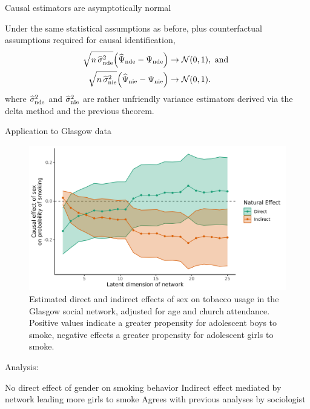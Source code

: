 \documentclass[aspectratio=169]{beamer}
\theoremstyle{remark}
\begin{document}
\begin{frame}{Causal estimators are asymptotically normal}
    \vspace{2mm}
    \begin{theorem}
        Under the same statistical assumptions as before, plus counterfactual assumptions required for causal identification,
        \begin{align*}
            \sqrt{n \, \sigmahatnde} \paren*{\ndehat - \nde}
             & \to
            \Normal{0}{1}, \text { and } \\
            \sqrt{n \, \sigmahatnie} \paren*{\niehat - \nie}
             & \to
            \Normal{0}{1}.
        \end{align*}
        \noindent where $\widehat{\sigma}^2_\mathrm{nde}$ and $\widehat{\sigma}^2_\mathrm{nie}$ are rather unfriendly variance estimators derived via the delta method and the previous theorem.
    \end{theorem}
\end{frame}


\begin{frame}{Application to Glasgow data}


    \begin{figure}
        \centering
        \includegraphics[width=.7\textwidth]{figures/glasgow/effects.png}
        \caption*{\footnotesize Estimated direct and indirect effects of sex on tobacco usage in the Glasgow social network, adjusted for age and church attendance. Positive values indicate a greater propensity for adolescent boys to smoke, negative effects a greater propensity for adolescent girls to smoke.}
        \label{fig:glasgow-estimates}
    \end{figure}

    Analysis:

    No direct effect of gender on smoking behavior
    Indirect effect mediated by network leading more girls to smoke
    Agrees with previous analyses by sociologist
\end{frame}
\end{document}
